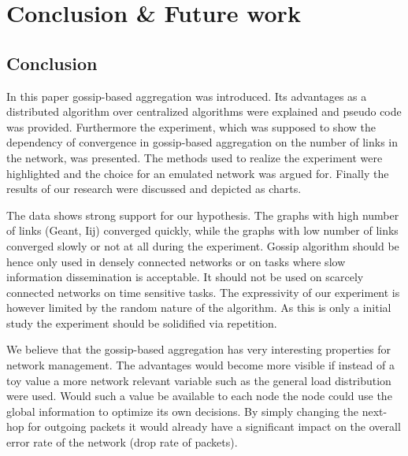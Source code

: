 \section{Conclusion \& Future work}
\label{sec:conclusion}

\subsection{Conclusion}
In this paper gossip-based aggregation was introduced. Its advantages as a distributed algorithm over centralized algorithms were explained and pseudo code was provided. Furthermore the experiment, which was supposed to show the dependency of convergence in gossip-based aggregation on the number of links in the network, was presented. The methods used to realize the experiment were highlighted and the choice for an emulated network was argued for. Finally the results of our research were discussed and depicted as charts.

The data shows strong support for our hypothesis. The graphs with high number of links (Geant, Iij) converged quickly, while the graphs with low number of links converged slowly or not at all during the experiment. Gossip algorithm should be hence only used in densely connected networks or on tasks where slow information dissemination is acceptable. It should not be used on scarcely connected networks on time sensitive tasks. The expressivity of our experiment is however limited by the random nature of the algorithm. As this is only a initial study the experiment should be solidified via repetition.

We believe that the gossip-based aggregation has very interesting properties for network management. The advantages would become more visible if instead of a toy value a more network relevant variable such as the general load distribution were used. Would such a value be available to each node the node could use the global information to optimize its own decisions. By simply changing the next-hop for outgoing packets it would already have a significant impact on the overall error rate of the network (drop rate of packets).

